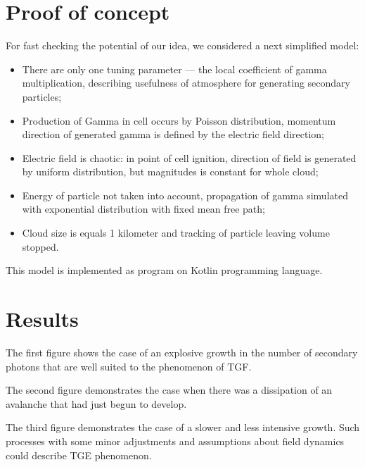 \documentclass[utf8]{webofc}
\begin{document}
\section{Proof of concept}
For fast checking the potential of our idea, we considered a next simplified model:  
\begin{itemize}
	\item There are only one tuning parameter  --- the local coefficient of gamma multiplication, describing usefulness of atmosphere for generating secondary particles;
	\item Production of Gamma in cell occurs by Poisson distribution, momentum direction of generated gamma is defined by the electric field direction;
	\item Electric field is chaotic: in point of cell ignition, direction of field is generated by uniform distribution, but magnitudes is constant for whole cloud;
	\item Energy of particle not taken into account, propagation of gamma simulated with exponential distribution with fixed mean free path;
	\item Cloud size is equals 1 kilometer and tracking of particle leaving volume stopped. 
\end{itemize}
    This model is implemented as program on Kotlin programming language.%
    
    \section{Results}

    The first figure shows the case of an explosive growth in the number of secondary photons that are well suited to the phenomenon of TGF.
        
    The second figure demonstrates the case when there was a dissipation of an avalanche that had just begun to develop.
       
    The third figure demonstrates the case of a slower and less intensive growth. Such processes with some minor adjustments and assumptions about field dynamics could describe TGE phenomenon.
    
\end{document}
